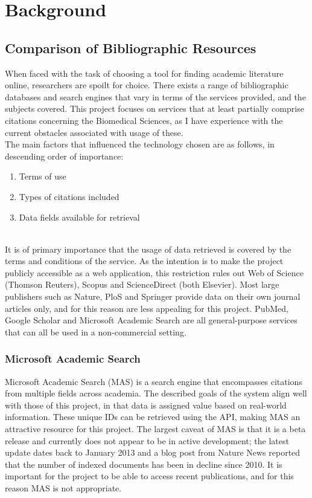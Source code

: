 \documentclass[PROP_AGutteridge_CS.tex]{subfiles}
\begin{document}
\chapter{Background}
\section{Comparison of Bibliographic Resources}
When faced with the task of choosing a tool for finding academic literature online, researchers are spoilt for choice. There exists a range of bibliographic databases and search engines that vary in terms of the services provided, and the subjects covered. This project focuses on services that at least partially comprise citations concerning the Biomedical Sciences, as I have experience with the current obstacles associated with usage of these.\\

\noindent The main factors that influenced the technology chosen are as follows, in descending order of importance:
\begin{enumerate}
\item Terms of use
\item Types of citations included
\item Data fields available for retrieval
\end{enumerate}

\noindent \\ It is of primary importance that the usage of data retrieved is covered by the terms and conditions of the service. As the intention is to make the project publicly accessible as a web application, this restriction rules out Web of Science (Thomson Reuters), Scopus and ScienceDirect (both Elsevier). Most large publishers such as Nature, PloS and Springer provide data on their own journal articles only, and for this reason are less appealing for this project. PubMed, Google Scholar and Microsoft Academic Search are all general-purpose services that can all be used in a non-commercial setting.

\noindent \subsection{Microsoft Academic Search}
Microsoft Academic Search (MAS) is a search engine that encompasses citations from multiple fields across academia. The described goals of the system align well with those of this project, in that data is assigned value based on real-world information\cite{microsoft-help}. These unique IDs can be retrieved using the API, making MAS an attractive resource for this project. The largest caveat of MAS is that it is a beta release and currently does not appear to be in active development; the latest update dates back to January 2013\cite{microsoft-help} and a blog post from Nature News reported that the number of indexed documents has been in decline since 2010\cite{nature-news}. It is important for the project to be able to access recent publications, and for this reason MAS is not appropriate.
\end{document}
